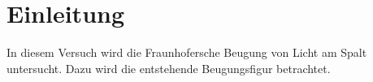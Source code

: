 
\section{Einleitung}
In diesem Versuch wird die Fraunhofersche Beugung von Licht am Spalt untersucht. Dazu wird die entstehende Beugungsfigur betrachtet.